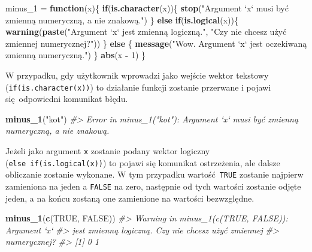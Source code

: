 \documentclass[paper=6in:9in,pagesize=pdftex,headinclude=on,footinclude=on,10pt]{scrbook}
\newenvironment{Shaded}{\begin{snugshade}}{\end{snugshade}}
\newcommand{\CommentTok}[1]{\textcolor[rgb]{0.56,0.35,0.01}{\textit{#1}}}
\newcommand{\ControlFlowTok}[1]{\textcolor[rgb]{0.13,0.29,0.53}{\textbf{#1}}}
\newcommand{\DecValTok}[1]{\textcolor[rgb]{0.00,0.00,0.81}{#1}}
\newcommand{\KeywordTok}[1]{\textcolor[rgb]{0.13,0.29,0.53}{\textbf{#1}}}
\newcommand{\NormalTok}[1]{#1}
\newcommand{\OperatorTok}[1]{\textcolor[rgb]{0.81,0.36,0.00}{\textbf{#1}}}
\newcommand{\OtherTok}[1]{\textcolor[rgb]{0.56,0.35,0.01}{#1}}
\newcommand{\StringTok}[1]{\textcolor[rgb]{0.31,0.60,0.02}{#1}}
\begin{document}
\begin{Shaded}
\begin{Highlighting}[]
\NormalTok{minus_}\DecValTok{1}\NormalTok{ =}\StringTok{ }\ControlFlowTok{function}\NormalTok{(x)\{}
  \ControlFlowTok{if}\NormalTok{(}\KeywordTok{is.character}\NormalTok{(x))\{}
    \KeywordTok{stop}\NormalTok{(}\StringTok{"Argument `x` musi być zmienną numeryczną, a nie znakową."}\NormalTok{)}
\NormalTok{  \} }\ControlFlowTok{else} \ControlFlowTok{if}\NormalTok{(}\KeywordTok{is.logical}\NormalTok{(x))\{}
    \KeywordTok{warning}\NormalTok{(}\KeywordTok{paste}\NormalTok{(}\StringTok{"Argument `x` jest zmienną logiczną."}\NormalTok{,}
                  \StringTok{"Czy nie chcesz użyć zmiennej numerycznej?"}\NormalTok{))}
\NormalTok{  \} }\ControlFlowTok{else}\NormalTok{ \{}
    \KeywordTok{message}\NormalTok{(}\StringTok{"Wow. Argument `x` jest oczekiwaną zmienną numeryczną."}\NormalTok{)}
\NormalTok{  \}}
  \KeywordTok{abs}\NormalTok{(x }\OperatorTok{-}\StringTok{ }\DecValTok{1}\NormalTok{)}
\NormalTok{\}}
\end{Highlighting}
\end{Shaded}

W przypadku, gdy użytkownik wprowadzi jako wejście wektor tekstowy (\texttt{if(is.character(x))}) to działanie funkcji zostanie przerwane i pojawi się~odpowiedni komunikat błędu.

\begin{Shaded}
\begin{Highlighting}[]
\KeywordTok{minus_1}\NormalTok{(}\StringTok{"kot"}\NormalTok{)}
\CommentTok{#> Error in minus_1("kot"): Argument `x` musi być zmienną numeryczną, a nie znakową.}
\end{Highlighting}
\end{Shaded}

Jeżeli jako argument \texttt{x} zostanie podany wektor logiczny (\texttt{else\ if(is.logical(x))}) to pojawi się komunikat ostrzeżenia, ale dalsze obliczanie zostanie wykonane.
W tym przypadku wartość~\texttt{TRUE} zostanie najpierw zamieniona na jeden a \texttt{FALSE} na zero, następnie od tych wartości zostanie odjęte jeden, a na końcu zostaną one zamienione na wartości bezwzględne.

\begin{Shaded}
\begin{Highlighting}[]
\KeywordTok{minus_1}\NormalTok{(}\KeywordTok{c}\NormalTok{(}\OtherTok{TRUE}\NormalTok{, }\OtherTok{FALSE}\NormalTok{))}
\CommentTok{#> Warning in minus_1(c(TRUE, FALSE)): Argument `x`}
\CommentTok{#> jest zmienną logiczną. Czy nie chcesz użyć zmiennej}
\CommentTok{#> numerycznej?}
\CommentTok{#> [1] 0 1}
\end{Highlighting}
\end{Shaded}
\end{document}
